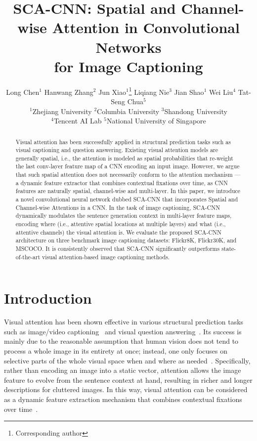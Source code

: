 \documentclass[10pt,twocolumn,letterpaper]{article}
\begin{document}
\title{SCA-CNN: Spatial and Channel-wise Attention in Convolutional Networks \\ for Image Captioning}
\author{Long Chen$^{1}$ \; Hanwang Zhang$^{2}$ \; Jun Xiao$^{1}$\thanks{Corresponding author} \; Liqiang Nie$^{3}$ \;
Jian Shao$^{1}$ \; Wei Liu$^{4}$ \; Tat-Seng Chua$^{5}$ \\
$^{1}$Zhejiang University \quad $^{2}$Columbia University \quad $^{3}$Shandong University \\
$^{4}$Tencent AI Lab \quad $^{5}$National University of Singapore \\
}



\maketitle
\thispagestyle{empty}

\begin{abstract}
Visual attention has been successfully applied in structural prediction tasks such as visual captioning and question answering. Existing visual attention
models are generally spatial, i.e., the attention is modeled as spatial probabilities that re-weight the last conv-layer feature map of a CNN encoding an
input image. However, we argue that such spatial attention does not necessarily conform to the attention mechanism --- a dynamic feature extractor that
combines contextual fixations over time, as CNN features are naturally spatial, channel-wise and multi-layer. In this paper, we introduce a novel
convolutional neural network dubbed SCA-CNN that incorporates Spatial and Channel-wise Attentions in a CNN. In the task of image captioning, SCA-CNN
dynamically modulates the sentence generation context in multi-layer feature maps, encoding where (i.e., attentive spatial locations at multiple layers) and
what (i.e., attentive channels) the visual attention is. We evaluate the proposed SCA-CNN architecture on three benchmark image captioning datasets:
Flickr8K, Flickr30K, and MSCOCO. It is consistently observed that SCA-CNN significantly outperforms state-of-the-art visual attention-based image captioning
 methods.
\end{abstract}
\section{Introduction}
Visual attention has been shown effective in various structural prediction tasks such as image/video captioning~\cite{xu2015show,yao2015describing} and visual
question answering~\cite{chen2015abc,yang2015stacked,xu2015ask}. Its success is mainly due to the reasonable assumption that human vision does not tend to
process a whole image in its entirety at once; instead, one only focuses on selective parts of the whole visual space when and where as
needed~\cite{corbetta2002control}. Specifically, rather than encoding an image into a static vector, attention allows the image feature to evolve from the
sentence context at hand, resulting in richer and longer descriptions for cluttered images. In this way, visual attention can be considered as a dynamic
feature extraction mechanism that combines contextual fixations over time~\cite{mnih2014recurrent,stollenga2014deep}.
\end{document}
